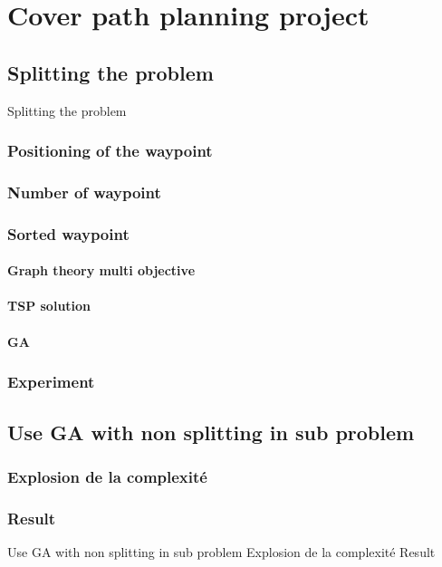 \chapter{Cover path planning project } 


\minitoc


\section{Splitting the problem }
	Splitting the problem 
			\subsection{Positioning of the waypoint }
			\subsection{Number of waypoint }
			\subsection{Sorted waypoint}
				\subsubsection{Graph theory multi objective  }
				\subsubsection{TSP solution }
				\subsubsection{GA}
			\subsection{Experiment }
		
\section{Use GA with non splitting in sub problem }
		\subsection{Explosion  de la complexité }
		\subsection{Result }
Use GA with non splitting in sub problem
			Explosion  de la complexité 
			Result 





